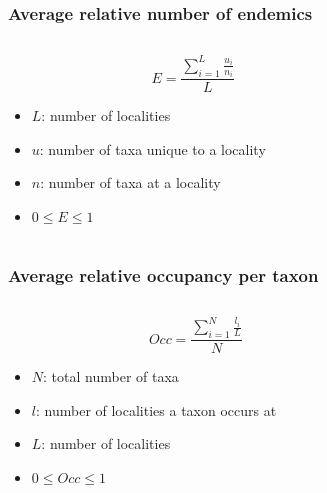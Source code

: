 \documentclass{beamer} \usepackage{amsmath,amsthm}
\begin{document}
\begin{frame}
  \frametitle{Average relative number of endemics}

  \begin{columns}
    \begin{column}{0.5\textwidth}
      \[
        E = \frac{\sum_{i = 1}^{L} \frac{u_{i}}{n_{i}}}{L}
      \]

      \begin{itemize}
        \item \(L\): number of localities
        \item \(u\): number of taxa unique to a locality
        \item \(n\): number of taxa at a locality
        \item \(0 \leq E \leq 1\)
      \end{itemize}
    \end{column}
    \begin{column}{0.5\textwidth}
    \end{column}
  \end{columns}
\end{frame}

\begin{frame}
  \frametitle{Average relative occupancy per taxon}

  \begin{columns}
    \begin{column}{0.5\textwidth}
      \[
        Occ = \frac{\sum_{i = 1}^{N} \frac{l_{i}}{L}}{N}
      \]

      \begin{itemize}
        \item \(N\): total number of taxa
        \item \(l\): number of localities a taxon occurs at
        \item \(L\): number of localities
        \item \(0 \leq Occ \leq 1\)
      \end{itemize}
    \end{column}
    \begin{column}{0.5\textwidth}
    \end{column}
  \end{columns}
\end{frame}
\end{document}
